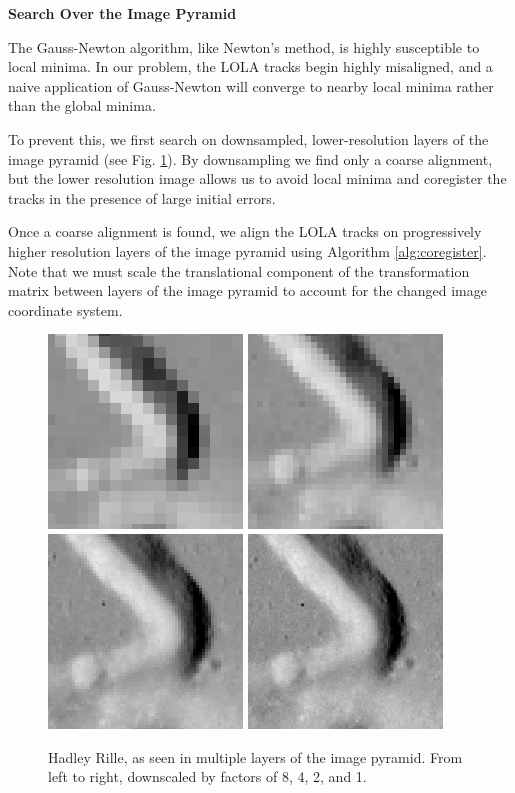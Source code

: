 {\bf Search Over the Image Pyramid}

The Gauss-Newton algorithm, like Newton's method, is highly susceptible to local minima.
In our problem, the LOLA tracks begin highly misaligned, and a naive application of Gauss-Newton
will converge to nearby local minima rather than the global minima.

To prevent this, we first search
on downsampled, lower-resolution layers of the image pyramid (see Fig. \ref{fig:pyramid}).
By downsampling we find only a coarse alignment, but the lower resolution image allows us to
avoid local minima and coregister the tracks in the presence of large initial errors.

Once a coarse alignment is found, we align the LOLA tracks on progressively higher resolution
layers of the image pyramid using Algorithm \ref{alg:coregister}. Note that we must scale
the translational component of the transformation matrix between layers of the image
pyramid to account for the changed image coordinate system.

\begin{figure}
	\includegraphics[width=0.235\columnwidth]{lidar2img/fig/hadley_rille_8.png}
	\includegraphics[width=0.235\columnwidth]{lidar2img/fig/hadley_rille_4.png}
	\includegraphics[width=0.235\columnwidth]{lidar2img/fig/hadley_rille_2.png}
	\includegraphics[width=0.235\columnwidth]{lidar2img/fig/hadley_rille_1.png}
	\caption{Hadley Rille, as seen in multiple layers of the image pyramid. From left to right,
	downscaled by factors of 8, 4, 2, and 1.}
	\label{fig:pyramid}
\end{figure}

